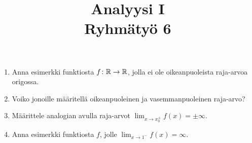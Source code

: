 \documentclass[11pt,a4paper]{amsart}
\title{Analyysi I\\Ryhmätyö 6}
\author{}
\date{}
\begin{document}

\begin{exercise}
  \leavevmode\par
  \begin{enumerate}[label=(\alph*), nosep]
    \item Anna esimerkki funktiosta \(f\colon \mathbb{R} \to \mathbb{R}\), jolla ei ole
      oikeanpuoleista raja-arvoa origossa.
    \item Voiko jonoille määritellä oikeanpuoleinen ja vasemmanpuoleinen
      raja-arvo?
    \item Määrittele analogian avulla raja-arvot
      \(\lim_{x \to x_0^{\pm}} f(x) = \pm\infty\).
    \item Anna esimerkki funktiosta \(f\), jolle
      \(\lim_{x \to 1^-} f(x) = \infty\).
  \end{enumerate}
\end{exercise}
\end{document}
